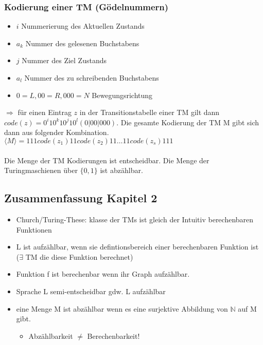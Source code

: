 \documentclass[a4paper, 10pt]{article}
\theoremstyle{definition}
\newcommand{\goedl}[1]{\langle {#1}\rangle}
\begin{document}
\subsubsection{Kodierung einer TM (Gödelnummern)}
\begin{itemize}
    \item $i$ Nummerierung des Aktuellen Zustands
    \item $a_k$ Nummer des gelesenen Buchstabens
    \item $j$ Nummer des Ziel Zustands
    \item $a_l$ Nummer des zu schreibenden Buchstabens
    \item $0=L,00=R,000=N$ Bewegungsrichtung
\end{itemize}
$\Rightarrow$ für einen Eintrag $z$ in der Transitionstabelle einer TM gilt dann 
$code(z)=0^i10^k10^j10^l(0|00|000)$. Die gesamte Kodierung der TM M gibt sich dann aus folgender Kombination.
$\goedl{M}=111code(z_1)11code(z_2)11\dots11code(z_s)111$
\\ \\
Die Menge der TM Kodierungen ist entscheidbar. Die Menge der Turingmaschienen über $\{0,1\}$ ist abzählbar.
\subsection{Zusammenfassung Kapitel 2}
\begin{itemize}
    \item Church/Turing-These: klasse der TMs ist gleich der Intuitiv berechenbaren Funktionen
    \item L ist aufzählbar, wenn sie defintionsbereich einer berechenbaren Funktion ist ($\exists$ TM die diese Funktion berechnet)
    \item Funktion f ist berechenbar wenn ihr Graph aufzählbar.
    \item Sprache L semi-entscheidbar gdw. L aufzählbar
    \item eine Menge M ist abzählbar wenn es eine surjektive Abbildung von $\mathbb{N}$ auf M gibt.\begin{itemize}
        \item Abzählbarkeit $\neq$ Berechenbarkeit!
    \end{itemize}
    
\end{itemize}
\end{document}
